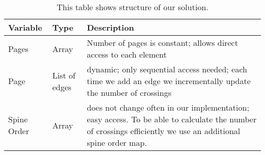 \begin{table}
\centering
\begin{tabular}{llp{7cm}}
\toprule
\textbf{Variable} & \textbf{Type} & \textbf{Description} \\
\midrule
Pages & Array & Number of pages is constant; allows direct access to each element \\
Page & List of edges & dynamic; only sequential access needed; each time we add an edge we incrementally update the number of crossings \\
Spine Order & Array & does not change often in our implementation; easy access. To be able to calculate
the number of crossings efficiently we use an additional spine order map.\\

\bottomrule 

\end{tabular}

\caption{This table shows structure of our solution.}
\label{tab:sol}
\end{table}









              

